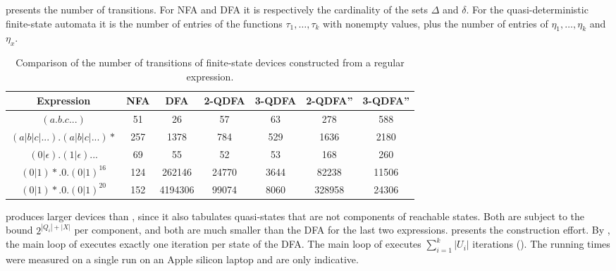  presents the number of transitions. For NFA and DFA
it is respectively the cardinality of the sets $\Delta$ and $\delta$. For the
quasi-deterministic finite-state automata it is the number of entries of the functions
$\tau_1, \ldots, \tau_k$ with nonempty values, plus the number of entries of $\eta_1,
\ldots, \eta_k$ and $\eta_x$.

\begin{table}[ht]
  \centering
  \small
  \setlength{\tabcolsep}{4pt}
  \begin{tabular}{||c c c c c c c||}
    \hline
    Expression & NFA & DFA & 2-QDFA & 3-QDFA & 2-QDFA'' & 3-QDFA'' \\ [0.5ex]
    \hline
    $(a.b.c...)$ & 51 & 26 & 57 & 63 & 278 & 588 \\
    \hline
    $(a|b|c|...).(a|b|c|...)*$ & 257 & 1378 & 784 & 529 & 1636 & 2180 \\
    \hline
    $(0|\epsilon).(1|\epsilon)...$ & 69 & 55 & 52 & 53 & 168 & 260 \\
    \hline
    $(0|1)*.0.(0|1)^{16}$ & 124 & 262146 & 24770 & 3644 & 82238 & 11506 \\
    \hline
    $(0|1)*.0.(0|1)^{20}$ & 152 & 4194306 & 99074 & 8060 & 328958 & 24306 \\
    \hline
  \end{tabular}
  \caption{Comparison of the number of transitions of finite-state devices
    constructed from a regular expression.}
  \label{tbl:transition_comparison}
\end{table}

 produces larger devices than
, since it also tabulates quasi-states that are not
components of reachable states. Both are subject to the bound $2^{|Q_i| + |X|}$ per
component, and both are much smaller than the DFA for the last two expressions.
\bigbreak
{} presents the construction effort. By
, the main loop of  executes
exactly one iteration per state of the DFA. The main loop of
 executes $\sum_{i=1}^k |U_i|$ iterations
(). The running times were measured on a
single run on an Apple silicon laptop and are only indicative.

